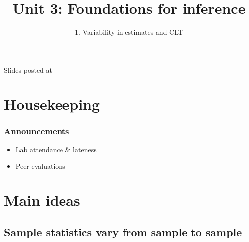 \documentclass[11pt,containsverbatim,handout,xcolor=xelatex,dvipsnames,table]{beamer}
\title{Unit 3: Foundations for inference}
\subtitle{1. Variability in estimates and CLT}
\author{\CourseName}
\date{}
\institute{\InstituteName}
\begin{document}



\begin{frame}[plain]

\titlepage

\vfill

{\scriptsize {} \hfill Slides posted at  \webURL{\CourseSite}}

\addtocounter{framenumber}{-1} 

\end{frame}


\section{Housekeeping}


\begin{frame}
\frametitle{Announcements}

\begin{itemize}

\item Lab attendance \& lateness

\item Peer evaluations

\end{itemize}

\end{frame}


\section{Main ideas}


\subsection{Sample statistics vary from sample to sample}
\label{mi1}

\end{document}
